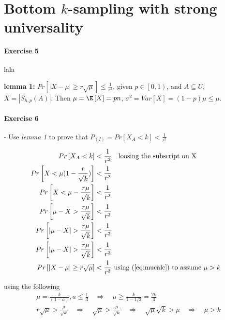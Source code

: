 \section{Bottom $k$-sampling with strong universality}

\paragraph{Exercise 5}
lala


\vspace{50mm}

\textbf{lemma 1:} $Pr\left[ |X - \mu| \geq r\sqrt{\mu} \right] \leq \frac{1}{r^2}$, given $p \in \left[0,1\right)$, and $A \subseteq U$, $X = |S_{h,p}(A)|$.
Then  $\mu = \E\left[ X \right] = p n$, $\sigma^2 = Var\left[ X \right] = (1-p)\mu \leq \mu$.


\paragraph{Exercise 6} - Use \textit{lemma 1} to prove that $P_{(I)} = Pr\left[ X_A < k \right] < \frac{1}{r^2}$

\begin{align}
  Pr \left[ X_A < k \right] &< \frac{1}{r^2} \quad \text{loosing the subscript on X} \\
  Pr \left[ X < \mu(1-\frac{r}{\sqrt{k}}) \right] &< \frac{1}{r^2}  \\
  Pr \left[ X < \mu -\frac{r \mu}{\sqrt{k}} \right] &< \frac{1}{r^2}  \\
  Pr \left[ \mu - X > \frac{r \mu}{\sqrt{k}} \right] &< \frac{1}{r^2}  \\
  Pr \left[ |\mu - X| > \frac{r \mu}{\sqrt{k}} \right] &< \frac{1}{r^2}  \\
  Pr \left[ |\mu - X| > \frac{r \mu}{\sqrt{k}} \right] &< \frac{1}{r^2}  \\
  Pr \left[ |X - \mu| \geq r \sqrt{\mu} \right] &< \frac{1}{r^2} \text{ using (\ref{eq:mucalc}) to assume } \mu > k
\end{align}

using the following
\begin{align}
  &\mu = \frac{k}{(1-a)}, a\leq\frac{1}{3}  \quad \Rightarrow \quad  \mu \geq \frac{k}{1-1/3} = \frac{2k}{3} \\
  &r \sqrt{\mu} > \frac{\mu}{\sqrt{k}} \quad \Rightarrow \quad \sqrt{\mu} > \frac{\mu}{\sqrt{k}} \quad \Rightarrow \quad \sqrt{\mu} \sqrt{k} > \mu \quad \Rightarrow \quad \mu > k \label{eq:mucalc}
\end{align}


